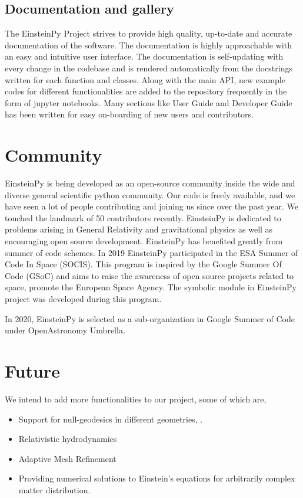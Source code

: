 \documentclass[onecolumn]{aa}
\begin{document}
\subsection{ Documentation and gallery} \label{subsec:doc}
The EinsteinPy Project strives to provide high quality, up-to-date and accurate documentation of the software. The documentation is highly approachable with an easy and intuitive user interface. The documentation is self-updating with every change in the codebase and is rendered automatically from the docstrings written for each function and classes. Along with the main API, new example codes for different functionalities are added to the repository frequently in the form of jupyter notebooks. Many sections like User Guide and Developer Guide has been written for easy on-boarding of new users and contributors.
	
\section{Community} \label{sec:COMMUNITY}
EinsteinPy is being developed as an open-source community inside the wide and diverse general scientific python community. Our code is freely available, and we have seen a lot of people contributing and joining us since over the past year. We touched the landmark of 50 contributors recently. EinsteinPy is dedicated to problems arising in General Relativity and gravitational physics as well as encouraging open source development. EinsteinPy has benefited greatly from summer of code schemes. In 2019 EinsteinPy participated in the ESA Summer of Code In Space (SOCIS). This program is inspired by the Google Summer Of Code (GSoC) and aims to raise the awareness of open source projects related to space, promote the European Space Agency. The symbolic module in EinsteinPy project was developed during this program.

In 2020, EinsteinPy is selected as a sub-organization in Google Summer of Code under OpenAstronomy Umbrella. 

\section{Future} \label{sec:FUTURE}
We intend to add more functionalities to our project, some of which are, 
\begin{itemize}
\item Support for null-geodesics in different geometries, . 
\item Relativistic hydrodynamics
\item Adaptive Mesh Refinement 
\item Providing numerical solutions to Einstein’s equations for arbitrarily complex matter distribution.
\end{itemize}
\end{document}
